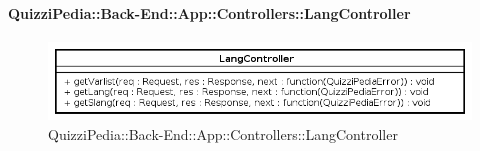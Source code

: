 \paragraph{QuizziPedia::Back-End::App::Controllers::LangController}
\label{QuizziPedia::Back-End::App::Controllers::UserController}
\begin{figure}[ht]
	\centering
	\includegraphics[scale=0.8]{UML/Classi/Back-End/QuizziPedia_Back-End_App_Controllers_langController.png}
	\caption{QuizziPedia::Back-End::App::Controllers::LangController}
\end{figure}
\FloatBarrier

